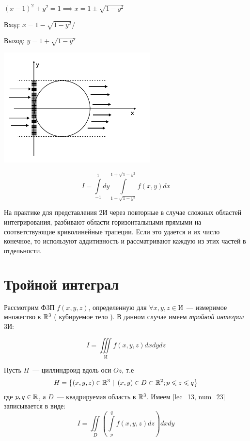 \documentclass[../../main.tex]{subfiles}
\begin{document}
\begin{exmp}
\begin{enumerate}
		$ \left( x - 1 \right)^2 + y^2 = 1 \implies x = 1 \pm \sqrt{1 - y^2} $
		
		Вход: $ x = 1 - \sqrt{1 - y^2 }$/
		
		Выход: $ y = 1 + \sqrt{1 - y^2 } $
		
		\begin{center}
			\includegraphics[width=0.6\textwidth]{lec13_circle_case2.png}
		\end{center}
		
		\[ I = \int\limits_{-1}^1 dy \int\limits_{1 - \sqrt{1 - y^2}} ^ 
		{1 + \sqrt{1 - y^2}} f \left( x, y\right) dx \]
	\end{enumerate}
\end{exmp}

На практике для представления 2И через повторные в случае
сложных областей интегрирования, разбивают области горизонтальными
прямыми на соответствующие криволинейные трапеции. Если это удается
и их число конечное, то используют аддитивность и рассматривают
каждую из этих частей в отдельности.

\section{Тройной интеграл }

Рассмотрим Ф3П $ f \left( x, y, z \right)$, определенную для 
$\forall x, y, z \in \text{И} $~--- измеримое множество в $ \mathbb{R}^3 $
( кубируемое тело ). В данном случае имеем \emph{тройной интеграл} 3И:

\begin{equation}
\label{lec_13, num_23}
I = \iiint\limits_{ \text{И} } f \left( x, y, z \right) dx dy dz
\end{equation}

\begin{thm}
	Пусть $ H $~--- циллиндроид вдоль оси $ Oz $, т.е 
	\begin{equation}
	\label{lec_13, num_24}
	H = \left\lbrace \left( x, y, z \right) \in \mathbb{R}^3\ |
	\ \left( x, y \right) \in D \subset \mathbb{R}^2; p \leqslant z \leqslant q \right\rbrace
	\end{equation}
	где $ p, q \in \mathbb{R} $, а $ D $~--- квадрируемая область в $ \mathbb{R}^3 $.
	Имеем \eqref {lec_13, num_23} записывается в виде:
	\begin{equation}
	\label{lec_13, num_25}
	I = \iint\limits_D \left( \int\limits_p^q f \left( x, y, z \right) dz \right) dx dy
	\end{equation}
\end{thm}
\end{document}
